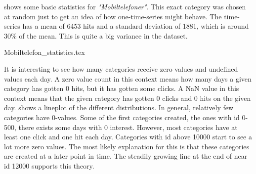  shows some basic statistics for \textit{"Mobiltelefoner"}.
This exact category was chosen at random just to get an idea of how one-time-series might behave.
The time-series has a mean of 6453 hits and a standard deviation of 1881, which is
around 30\% of the mean. This is quite a big variance in the dataset.

{Mobiltelefon_statistics.tex}

It is interesting to see how many categories receive zero values and undefined values each day.
A zero value count in this context means how many days a given category has gotten 0 hits, but it has gotten some clicks.
A NaN value in this context means that the given category has gotten 0 clicks and 0 hits on the given day.
 shows a lineplot of the different distributions.
In general, relatively few categories have 0-values.
Some of the first categories created, the ones with id 0-500, there exists some days with 0 interest.
However, most categories have at least one click and one hit each day.
Categories with id above 10000 start to see a lot more zero values.
The most likely explanation for this is that these categories are created at a later point in time.
The steadily growing line at the end of  near id 12000 supports this theory.
